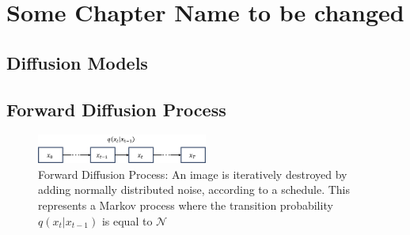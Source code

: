 \chapter{Some Chapter Name to be changed}

\section{Diffusion Models}
\section{Forward Diffusion Process}

\begin{figure}[h]
    \includegraphics[width=0.5\textwidth, inner]{../img/forward_diffusion.png}
    \caption{Forward Diffusion Process: An image is iteratively destroyed by adding normally distributed noise, 
    according to a schedule. This represents a Markov process where the transition probability $q(x_t|x_{t-1})$ 
    is equal to $\mathcal{N}$}
    \label{fig:forward_diffusion}
\end{figure}